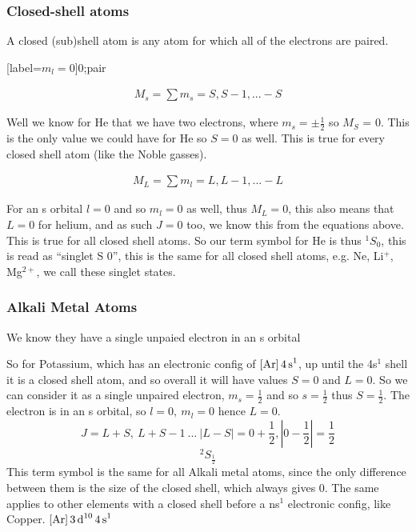 \documentclass{article}
\begin{document}
    \subsubsection{Closed-shell atoms}
    A closed (sub)shell atom is any atom for which all of the electrons are paired. 

    \begin{center}
        \begin{modiagram}[style=square, AO-width=15pt]
            [label={$m_l = 0$}]{0;pair}
        \end{modiagram}
        \begin{align*}
            M_s = \sum m_s = S, S-1, ... -S
        \end{align*}
    \end{center}
    
    Well we know for He that we have two electrons, where $m_s = \pm \frac{1}{2}$ so $M_S$ = 0. This is the 
    only value we could have for He so $S = 0$ as well. This is true for every closed shell atom (like the Noble gasses).
    \begin{center}
        \begin{align*}
            M_L = \sum m_l = L, L-1, ... -L
        \end{align*}
    \end{center}
    For an s orbital $l = 0$ and so $m_l = 0$ as well, thus $M_L = 0$, this also means that $L=0$ for helium, 
    and as such $J=0$ too, we know this from the equations above. This is true for all closed shell atoms.
    So our term symbol for He is thus $^1S_0$, this is read as ``singlet S 0'', this is the same for all closed shell atoms,
    e.g. Ne, Li$^+$, Mg$^{2+}$, we call these singlet states.

    \subsubsection{Alkali Metal Atoms}
    We know they have a single unpaied electron in an s orbital     
    \begin{modiagram}[style=square]
    \end{modiagram}

    So for Potassium, which has an electronic config of $\ce{[Ar] 4s^1}$, up until the 4s$^1$ shell it is a
    closed shell atom, and so overall it will have values $S = 0$ and $L = 0$. So we can consider it as a
    single unpaired electron, $m_s=\frac{1}{2}$ and so $s=\frac{1}{2}$ thus $S = \frac{1}{2}$. 
    The electron is in an s orbital, so $l = 0,\ m_l = 0$ hence $L = 0$.
    $$J = L+S,\ L+S-1\ ...\ |L-S| = 0 + \frac{1}{2}, |0-\frac{1}{2}| = \frac{1}{2}$$
    $$^2S_{\frac{1}{2}}$$
    This term symbol is the same for all Alkali metal atoms, since the only difference between them is the size
    of the closed shell, which always gives 0. The same applies to other elements with a closed shell before a ns$^{1}$
    electronic config, like Copper. $\ce{[Ar] 3d^10 4s^1}$
    \newline
\end{document}
